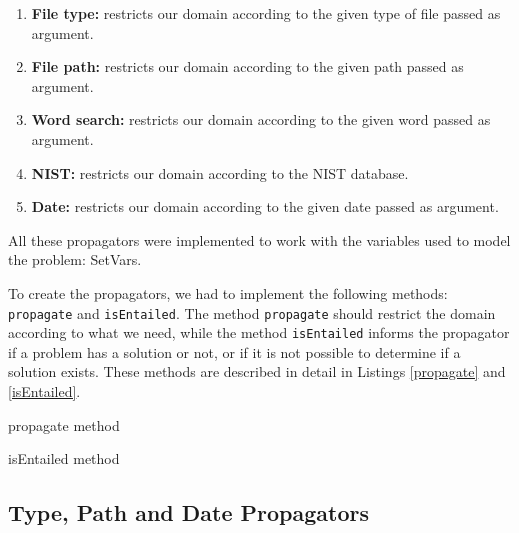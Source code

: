 \begin{enumerate}
    \item \textbf{File type:} restricts our domain according to the given type of file passed as argument.
    \item \textbf{File path:} restricts our domain according to the given path passed as argument.
    \item \textbf{Word search:} restricts our domain according to the given word passed as argument.
    \item \textbf{NIST:} restricts our domain according to the NIST database.
    \item \textbf{Date:} restricts our domain according to the given date passed as argument.
\end{enumerate}

All these propagators were implemented to work with the variables used to model the problem: SetVars.

To create the propagators, we had to implement the following methods: \texttt{propagate} and \texttt{isEntailed}. The method \texttt{propagate} should restrict the domain according to what we need, while the method \texttt{isEntailed} informs the propagator if a problem has a solution or not, or if it is not possible to determine if a solution exists. These methods are described in detail in Listings \ref{propagate} and \ref{isEntailed}.


\begin{algorithm}
    \caption{propagate method}
    \label{propagate}
    \begin{algorithmic}
            \EndIf
        \EndFor
    \end{algorithmic}
\end{algorithm}

\begin{algorithm}
    \caption{isEntailed method}
    \label{isEntailed}
    \begin{algorithmic}
        \Else
        \EndIf
    \end{algorithmic}
\end{algorithm}

\subsection{Type, Path and Date Propagators}

